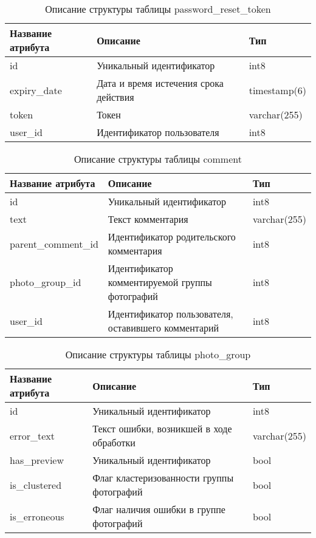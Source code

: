 \begin{table}[H]
  \caption{\onehalfspacing Описание структуры таблицы password_reset_token}\label{database-table-password-reset-token}
  \begin{tabular}{|p{6cm}|p{6cm}|p{4cm}|}
  \hline Название атрибута & Описание & Тип \\
  \hline id & Уникальный идентификатор & int8 \\
  \hline expiry_date & Дата и время истечения срока действия & timestamp(6) \\
  \hline token & Токен & varchar(255) \\
  \hline user_id & Идентификатор пользователя & int8 \\
  \hline
  \end{tabular}
\end{table}


\begin{table}[H]
  \caption{\onehalfspacing Описание структуры таблицы comment}\label{database-table-comment}
  \begin{tabular}{|p{6cm}|p{6cm}|p{4cm}|}
  \hline Название атрибута & Описание & Тип \\
  \hline id & Уникальный идентификатор & int8 \\
  \hline text & Текст комментария & varchar(255) \\
  \hline parent_comment_id & Идентификатор родительского комментария & int8 \\
  \hline photo_group_id & Идентификатор комментируемой группы фотографий & int8 \\
  \hline user_id & Идентификатор пользователя, оставившего комментарий & int8 \\
  \hline 
  \end{tabular}
\end{table}


\begin{table}[H]
  \caption{\onehalfspacing Описание структуры таблицы photo_group}\label{database-table-photo-group}
  \begin{tabular}{|p{6cm}|p{6cm}|p{4cm}|}
  \hline Название атрибута & Описание & Тип \\
  \hline id & Уникальный идентификатор & int8 \\
  \hline error_text & Текст ошибки, возникшей в ходе обработки & varchar(255) \\
  \hline has_preview & Уникальный идентификатор & bool \\
  \hline is_clustered & Флаг кластеризованности группы фотографий & bool \\
  \hline is_erroneous & Флаг наличия ошибки в группе фотографий & bool \\
  \end{tabular}
\end{table}

